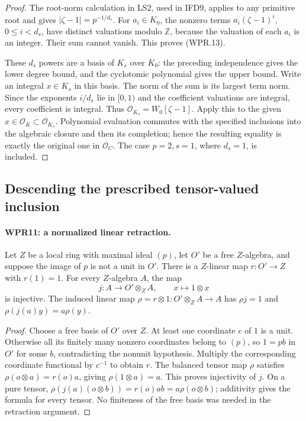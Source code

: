 \documentclass[11pt,a4paper]{article}
\numberwithin{equation}{section}
\theoremstyle{remark}\newtheorem{remark}[theorem]{Remark}
\begin{document}
\begin{proof}
The root-norm calculation in LS2, used in IFD9, applies to any
primitive root and gives $|\zeta-1|=p^{-1/d_s}$. For
$a_i\in K_0$, the nonzero terms $a_i(\zeta-1)^i$,
$0\leq i<d_s$, have distinct valuations modulo $\mathbb Z$,
because the valuation of each $a_i$ is an integer. Their sum
cannot vanish. This proves (WPR.13).

These $d_s$ powers are a basis of $K_s$ over $K_0$: the preceding
independence gives the lower degree bound, and the cyclotomic
polynomial gives the upper bound. Write an integral $x\in K_s$
in this basis. The norm of the sum is its largest term norm.
Since the exponents $i/d_s$ lie in $[0,1)$ and the coefficient
valuations are integral, every coefficient is integral.
Thus $\mathcal O_{K_s}=W_0[\zeta-1]$. Apply this to the given
$x\in\mathcal O_K\subset\mathcal O_{K_s}$. Polynomial evaluation
commutes with the specified inclusions into the algebraic closure
and then its completion; hence the resulting equality is exactly
the original one in $\mathcal O_C$. The case $p=2,s=1$, where
$d_s=1$, is included.
\end{proof}

\subsection{Descending the prescribed tensor-valued inclusion}

\paragraph{WPR11: a normalized linear retraction.}
\label{claim:WPR11}
Let $Z$ be a local ring with maximal ideal $(p)$, let $O'$ be
a free $Z$-algebra, and suppose the image of $p$ is not a unit
in $O'$. There is a $Z$-linear map $r:O'\to Z$ with $r(1)=1$.
For every $Z$-algebra $A$, the map
\[
 j:A\longrightarrow O'\otimes_Z A,\qquad x\longmapsto1\otimes x
 \tag{WPR.14}
\]
is injective. The induced linear map
$\rho=r\otimes1:O'\otimes_Z A\to A$ has
$\rho j=1$ and $\rho(j(a)y)=a\rho(y)$.

\begin{proof}
Choose a free basis of $O'$ over $Z$. At least one coordinate
$c$ of $1$ is a unit. Otherwise all its finitely many nonzero
coordinates belong to $(p)$, so $1=pb$ in $O'$ for some $b$,
contradicting the nonunit hypothesis. Multiply the corresponding
coordinate functional by $c^{-1}$ to obtain $r$.
The balanced tensor map $\rho$ satisfies
$\rho(o\otimes a)=r(o)a$, giving $\rho(1\otimes a)=a$.
This proves injectivity of $j$. On a pure tensor,
$\rho(j(a)(o\otimes b))=r(o)ab=a\rho(o\otimes b)$;
additivity gives the formula for every tensor. No finiteness
of the free basis was needed in the retraction argument.
\end{proof}
\end{document}
